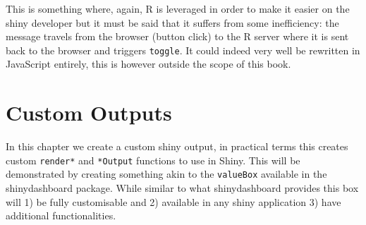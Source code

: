 \documentclass[
]{krantz}
\makeatletter
\newenvironment{Shaded}{\begin{snugshade}}{\end{snugshade}}
\newcommand{\ControlFlowTok}[1]{\textcolor[rgb]{0.27,0.27,0.27}{\textbf{#1}}}
\newcommand{\DataTypeTok}[1]{\textcolor[rgb]{0.27,0.27,0.27}{#1}}
\newcommand{\KeywordTok}[1]{\textcolor[rgb]{0.27,0.27,0.27}{\textbf{#1}}}
\newcommand{\NormalTok}[1]{#1}
\newcommand{\OperatorTok}[1]{\textcolor[rgb]{0.43,0.43,0.43}{\textbf{#1}}}
\newcommand{\StringTok}[1]{\textcolor[rgb]{0.5,0.5,0.5}{#1}}
\newenvironment{kframe}{%
\medskip{}
\setlength{\fboxsep}{.8em}
 \def\at@end@of@kframe{}%
 \ifinner\ifhmode%
  \def\at@end@of@kframe{\end{minipage}}%
  \begin{minipage}{\columnwidth}%
 \fi\fi%
 \def\FrameCommand##1{\hskip\@totalleftmargin \hskip-\fboxsep
 \colorbox{shadecolor}{##1}\hskip-\fboxsep
     \hskip-\linewidth \hskip-\@totalleftmargin \hskip\columnwidth}%
 \MakeFramed {\advance\hsize-\width
   \@totalleftmargin\z@ \linewidth\hsize
   \@setminipage}}%
 {\par\unskip\endMakeFramed%
 \at@end@of@kframe}
\renewenvironment{Shaded}{\begin{kframe}}{\end{kframe}}
\makeatother
\begin{document}
\begin{Shaded}
\end{Shaded}

This is something where, again, R is leveraged in order to make it easier on the shiny developer but it must be said that it suffers from some inefficiency: the message travels from the browser (button click) to the R server where it is sent back to the browser and triggers \texttt{toggle}. It could indeed very well be rewritten in JavaScript entirely, this is however outside the scope of this book.

\hypertarget{shiny-output}{%
\chapter{Custom Outputs}\label{shiny-output}}

In this chapter we create a custom shiny output, in practical terms this creates custom \texttt{render*} and \texttt{*Output} functions to use in Shiny. This will be demonstrated by creating something akin to the \texttt{valueBox} available in the shinydashboard \citep{R-shinydashboard} package. While similar to what shinydashboard provides this box will 1) be fully customisable and 2) available in any shiny application 3) have additional functionalities.
\end{document}
